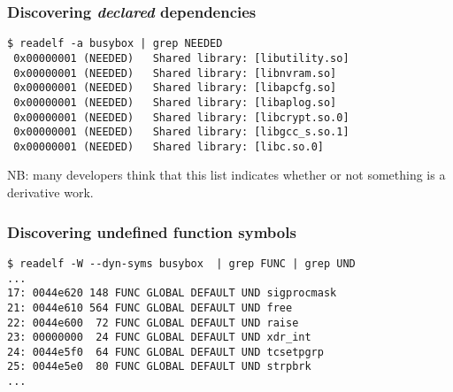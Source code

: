 \documentclass[11pt]{beamer}
\begin{document}

\begin{frame}[fragile]
\frametitle{Discovering \textit{declared} dependencies}

\begin{verbatim}
$ readelf -a busybox | grep NEEDED
 0x00000001 (NEEDED)   Shared library: [libutility.so]
 0x00000001 (NEEDED)   Shared library: [libnvram.so]
 0x00000001 (NEEDED)   Shared library: [libapcfg.so]
 0x00000001 (NEEDED)   Shared library: [libaplog.so]
 0x00000001 (NEEDED)   Shared library: [libcrypt.so.0]
 0x00000001 (NEEDED)   Shared library: [libgcc_s.so.1]
 0x00000001 (NEEDED)   Shared library: [libc.so.0]
\end{verbatim}

NB: many developers think that this list indicates whether or not something is
a derivative work.
\end{frame}


\begin{frame}[fragile]
\frametitle{Discovering undefined function symbols}
\begin{verbatim}
$ readelf -W --dyn-syms busybox  | grep FUNC | grep UND
...
17: 0044e620 148 FUNC GLOBAL DEFAULT UND sigprocmask
21: 0044e610 564 FUNC GLOBAL DEFAULT UND free
22: 0044e600  72 FUNC GLOBAL DEFAULT UND raise
23: 00000000  24 FUNC GLOBAL DEFAULT UND xdr_int
24: 0044e5f0  64 FUNC GLOBAL DEFAULT UND tcsetpgrp
25: 0044e5e0  80 FUNC GLOBAL DEFAULT UND strpbrk
...
\end{verbatim}
\end{frame}
\end{document}
